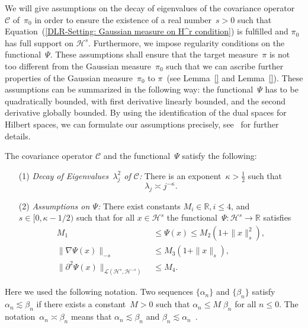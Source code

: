 We will give assumptions on the decay of eigenvalues of the covariance operator~$\mathcal{C}$ of~$\pi_0$ in order to ensure the existence of a real number~$s > 0$ such that Equation~(\ref{DLR-Setting: Gaussian measure on H^r condition}) is fulfilled and $\pi_0$ has full support on $\mathcal{H}^s$. Furthermore, we impose regularity conditions on the functional~$\Psi$. These assumptions shall ensure that the target measure~$\pi$ is not too different from the Gaussian measure~$\pi_0$ such that we can ascribe further properties of the Gaussian measure~$\pi_0$ to $\pi$~(see Lemma~\ref{} and Lemma~\ref{}). These assumptions can be summarized in the following way: the functional~$\Psi$ has to be quadratically bounded, with first derivative linearly bounded, and the second derivative globally bounded. By using the identification of the dual spaces for Hilbert spaces, we can formulate our assumptions precisely, see~\autocite[Assumption 2.1]{Pillai2012} for further details.

\begin{assum}
 \label{DLR-Setting: Assumptions on C and Psi}
 The covariance operator $\mathcal{C}$ and the functional~$\Psi$ satisfy the following:
 \begin{enumerate} 
  \item[(1)] \textit{Decay of Eigenvalues~$\lambda_j^2$ of $\mathcal{C}$: } There is an exponent~$\kappa > \tfrac{1}{2}$ such that
 \begin{equation}
 \label{DLR-Seeting: Assumption on decay of eigenvalues}
  \lambda_j \asymp j^{- \kappa}.
 \end{equation}
 \item[(2)] \textit{Assumptions on $\Psi$: } There exist constants $M_i \in \mathbb{R}, i \leq 4$, and $s \in [0, \kappa - 1/2)$ such that for all $x \in \mathcal{H}^s$ the functional~$\Psi: \mathcal{H}^s \to \mathbb{R}$ satisfies
 \begin{align}
 \label{DLR-Setting: Assumption on Psi 1}
  M_1 & \; \leq \Psi(x) \leq M_2 (1+ \| x \|_s^2), \\
  \label{DLR-Setting: Assumption on Psi 2}
  \| \nabla \Psi (x) \|_{-s} & \; \leq M_3 (1+\| x\|_s), \\
  \label{DLR-Setting: Assumption on Psi 3}
  \| \partial^2 \Psi (x) \|_{\mathcal{L}(\mathcal{H}^s, \mathcal{H}^{-s})} & \; \leq M_4.
 \end{align}
 \end{enumerate}
\end{assum}

Here we used the following notation. Two sequences $\{\alpha_n\}$ and $\{\beta_n\}$ satisfy $\alpha_n \lesssim  \beta_n$ if there exists a constant~$M>0$ such that $\alpha_n \leq M \; \beta_n$ for all $n \leq 0$. The notation~$\alpha_n \asymp \beta_n$ means that $\alpha_n \lesssim  \beta_n $ and $ \beta_n \lesssim  \alpha_n$~\autocite{Pillai2012}.

